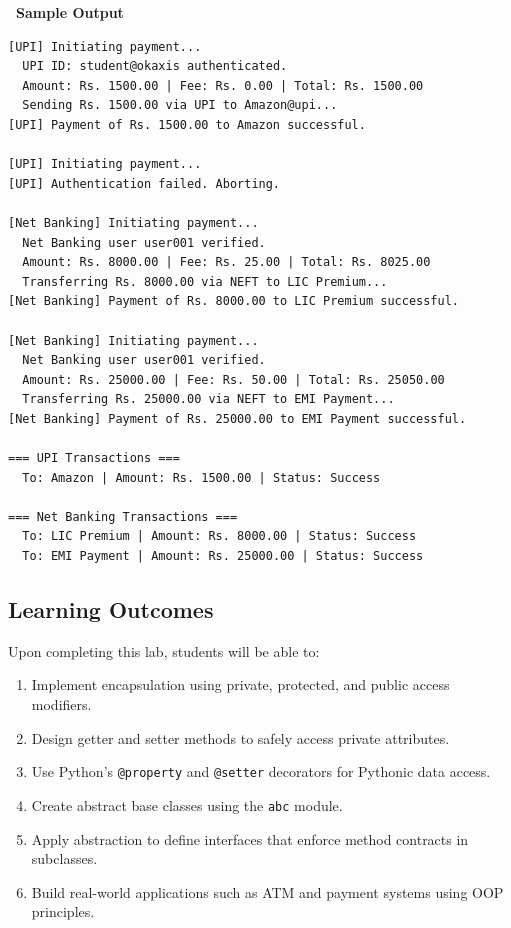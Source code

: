 \documentclass[12pt,a4paper]{article}
\newcommand{\outhead}{\noindent\colorbox{cmrgreen!25}%
  {\textbf{\small\color{cmrdark}~Sample Output~}}\par\vspace{-1pt}}
\begin{document}
\outhead
\begin{lstlisting}[style=outputstyle]
[UPI] Initiating payment...
  UPI ID: student@okaxis authenticated.
  Amount: Rs. 1500.00 | Fee: Rs. 0.00 | Total: Rs. 1500.00
  Sending Rs. 1500.00 via UPI to Amazon@upi...
[UPI] Payment of Rs. 1500.00 to Amazon successful.

[UPI] Initiating payment...
[UPI] Authentication failed. Aborting.

[Net Banking] Initiating payment...
  Net Banking user user001 verified.
  Amount: Rs. 8000.00 | Fee: Rs. 25.00 | Total: Rs. 8025.00
  Transferring Rs. 8000.00 via NEFT to LIC Premium...
[Net Banking] Payment of Rs. 8000.00 to LIC Premium successful.

[Net Banking] Initiating payment...
  Net Banking user user001 verified.
  Amount: Rs. 25000.00 | Fee: Rs. 50.00 | Total: Rs. 25050.00
  Transferring Rs. 25000.00 via NEFT to EMI Payment...
[Net Banking] Payment of Rs. 25000.00 to EMI Payment successful.

=== UPI Transactions ===
  To: Amazon | Amount: Rs. 1500.00 | Status: Success

=== Net Banking Transactions ===
  To: LIC Premium | Amount: Rs. 8000.00 | Status: Success
  To: EMI Payment | Amount: Rs. 25000.00 | Status: Success
\end{lstlisting}

\subsection{Learning Outcomes}
Upon completing this lab, students will be able to:
\begin{enumerate}
  \item Implement encapsulation using private, protected, and public access modifiers.
  \item Design getter and setter methods to safely access private attributes.
  \item Use Python's \texttt{@property} and \texttt{@setter} decorators for Pythonic data access.
  \item Create abstract base classes using the \texttt{abc} module.
  \item Apply abstraction to define interfaces that enforce method contracts in subclasses.
  \item Build real-world applications such as ATM and payment systems using OOP principles.
\end{enumerate}

\newpage
\end{document}
